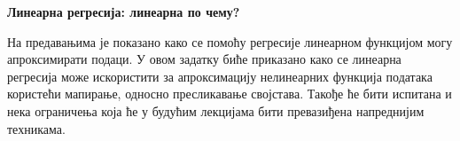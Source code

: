 \item {} {\bf Линеарна регресија: линеарна по чему?}

На предавањима је показано како се помоћу регресије линеарном функцијом могу апроксимирати подаци. У овом задатку биће приказано како се линеарна регресија може искористити за апроксимацију нелинеарних функција података користећи мапирање, односно пресликавање својстава. Такође ће бити испитана и нека ограничења која ће у будућим лекцијама бити превазиђена напреднијим техникама.

\begin{enumerate}
	
        \ifnum{} {
	  
        }\fi

	
        \ifnum{} {
	  
        }\fi

	
        \ifnum{} {
	  
        }\fi

        
        \ifnum{} {
	  
        }\fi

        
        \ifnum{} {
	  
        }\fi
\end{enumerate}
